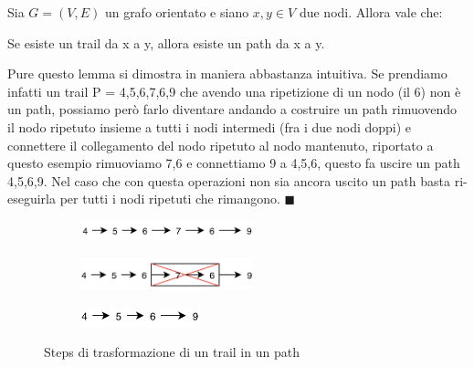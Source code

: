 \begin{lemma}\label{lemma-2}
Sia $G=(V,E)$ un grafo orientato e siano $x,y \in V$ due nodi. Allora vale che:
\begin{center}
    Se esiste un trail da x a y, allora esiste un path da x a y.
\end{center}
\end{lemma}
\begin{demostration}
Pure questo lemma si dimostra in maniera abbastanza intuitiva. Se prendiamo infatti un trail P = 4,5,6,7,6,9 che avendo una ripetizione di un nodo (il 6) non è un path, possiamo però farlo diventare andando a costruire un path rimuovendo il nodo ripetuto insieme a tutti i nodi intermedi (fra i due nodi doppi) e connettere il collegamento del nodo ripetuto al nodo mantenuto, riportato a questo esempio rimuoviamo 7,6 e connettiamo 9 a 4,5,6, questo fa uscire un path 4,5,6,9. Nel caso che con questa operazioni non sia ancora uscito un path basta ri-eseguirla per tutti i nodi ripetuti che rimangono. $\blacksquare$
\end{demostration}
\begin{figure}[h!]
    \centering
    \begin{subfigure}{.3\textwidth}
        \centering
        \includegraphics[width=5cm]{images/trail-path-1.png}
        \caption{}
    \end{subfigure}
    \hfill
    \begin{subfigure}{.3\textwidth}
        \centering
        \includegraphics[width=5cm]{images/trail-path-2.png}
        \caption{}
    \end{subfigure}
    \hfill
    \begin{subfigure}{.3\textwidth}
        \centering
        \includegraphics[width=3.5cm]{images/trail-path-3.png}
        \caption{}
    \end{subfigure}
    \vspace{-5pt}
    \caption{Steps di trasformazione di un trail in un path}
\end{figure}

